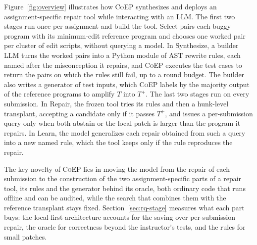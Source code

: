 \documentclass[acmsmall,screen,review,anonymous,nonacm]{acmart}
\newcommand{\tool}{\textsc{CoEP}\xspace}
\begin{document}
Figure~\ref{fig:overview} illustrates how \tool synthesizes and deploys an assignment-specific repair tool while interacting with an LLM. The first two stages run once per assignment and build the tool. Select pairs each buggy program with its minimum-edit reference program and chooses one worked pair per cluster of edit scripts, without querying a model. In Synthesize, a builder LLM turns the worked pairs into a Python module of AST rewrite rules, each named after the misconception it repairs, and \tool executes the test cases to return the pairs on which the rules still fail, up to a round budget. The builder also writes a generator of test inputs, which \tool labels by the majority output of the reference programs to amplify $T$ into $T^{+}$. The last two stages run on every submission. In Repair, the frozen tool tries its rules and then a hunk-level transplant, accepting a candidate only if it passes $T^{+}$, and issues a per-submission query only when both abstain or the local patch is larger than the program it repairs. In Learn, the model generalizes each repair obtained from such a query into a new named rule, which the tool keeps only if the rule reproduces the repair.

The key novelty of \tool lies in moving the model from the repair of each submission to the construction of the two assignment-specific parts of a repair tool, its rules and the generator behind its oracle, both ordinary code that runs offline and can be audited, while the search that combines them with the reference transplant stays fixed. Section~\ref{sec:rq-stage} measures what each part buys: the local-first architecture accounts for the saving over per-submission repair, the oracle for correctness beyond the instructor's tests, and the rules for small patches.
\end{document}

